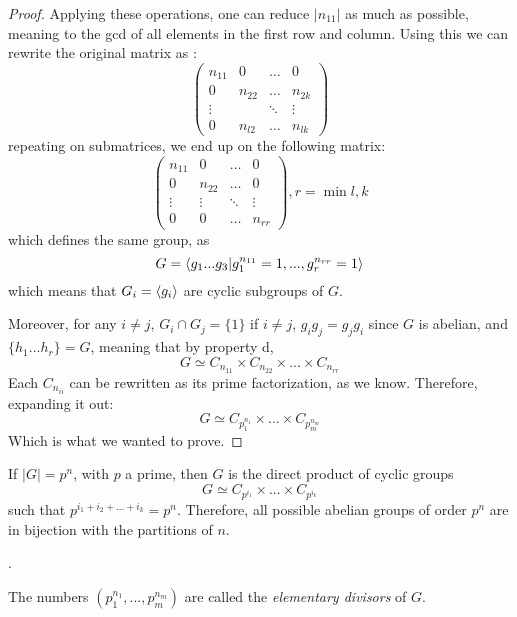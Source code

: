 \begin{proof}
  Applying these operations, one can reduce $|n_{11}|$ as much as possible, meaning to the gcd of all elements in the first row and column\footnotemark. Using this we can rewrite the original matrix as : 
  \[
    \begin{pmatrix}
      n_{11} &0&  \dots & 0  \\
      0      &n_{22}&  \dots & n_{2k}  \\
      \vdots & & \ddots & \vdots \\
      0      &n_{l2}&  \dots & n_{lk}
    \end{pmatrix}
  \]
  repeating on submatrices, we end up on the following matrix: 
  \[
    \begin{pmatrix}
      n_{11} &0&  \dots & 0  \\
      0      &n_{22}&  \dots & 0  \\
      \vdots &\vdots & \ddots & \vdots \\
      0      &0&  \dots & n_{rr}
    \end{pmatrix}, r = \min{l, k}
  \]
  which defines the same group, as \[G = \langle g_1...g_3 | g_1^{n_{11}} = 1, ..., g_r^{n_{rr}} = 1 \rangle\] which means that $G_i = \langle g_i \rangle$ are cyclic subgroups of $G$.

  Moreover, for any $i \neq j$, $G_i \cap G_j = \{1\}$ if $i \neq j$, $g_ig_j = g_jg_i$ since $G$ is abelian, and $\{h_1...h_r\} = G$, meaning that by property d, 
  \[
    G \simeq C_{n_{11}} \times C_{n_{22}} \times ... \times C_{n_{rr}}
  \]
  Each $C_{n_{ii}}$ can be rewritten as its prime factorization, as we know. 
  Therefore, expanding it out: 
  \[
    G \simeq C_{p_1^{n_1}} \times ... \times C_{p_m^{n_m}} 
  \]
  Which is what we wanted to prove.
\end{proof}
\begin{corollary}
  If $|G| = p^n$, with $p$ a prime, then $G$ is the direct product of cyclic groups
  \[
    G \simeq C_{p^{i_1}} \times ... \times C_{p^{i_k}}
  \]
  such that $p^{i_1 + i_2 + ... + i_k} = p^{n}$. Therefore, all possible abelian groups of order $p^n$ are in bijection with the partitions of $n$. 
\end{corollary}

. 
\begin{definition}
  The numbers $(p_1^{n_1}, ..., p_m^{n_m})$ are called the \emph{elementary divisors} of $G$. 
\end{definition}

